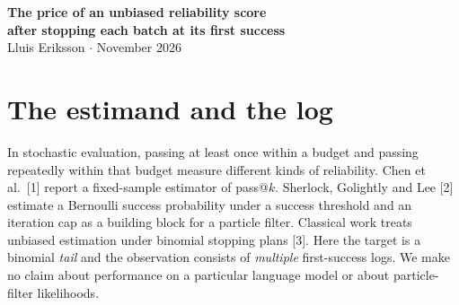 \documentclass[11pt]{article}
\begin{document}
\begin{center}{\LARGE\bfseries The price of an unbiased reliability score\\ after stopping each batch at its first success}\\[8pt]
Lluis Eriksson \quad $\cdot$  November 2026
\end{center}
\begin{abstract}
Suppose a benchmark logs independent batches of identical Bernoulli trials, terminating each batch at its first success or its own cap. Can these logs estimate the chance of at least $m$ successes in the full budget of $T$ trials, where $m$ is the number of batches? Among all nonnegative scores unbiased for every success probability, the smallest possible upper bound is $\binom{T-1}{m-1}$, regardless of how the budget is split. An explicit score attains this bound and minimizes variance at every success probability within the nonnegative unbiased class. Balancing the batch caps minimizes that variance at fixed full budget, while increasing the expected number of trials actually observed. With unrestricted batch-specific success probabilities a nonnegative unbiased score does not exist for $1<m<T$. At a fixed common cap, persistent variation in task difficulty can make the expected score exponentially small relative to the target, even when the target itself is rare. With two attempts per task the mean underestimates the target for unequal interior probabilities. For any fixed cap we derive the log rate at which calibration changes as task failures become sparse, including examples with a full target of one and a limiting mean score strictly below one.
 For any fixed number of tasks with arbitrary individual success probabilities against a common background, we prove that the score underestimates the full tail on every success-count stratum once the bank is sufficiently large.
\end{abstract}
\section*{The estimand and the log}
In stochastic evaluation, passing at least once within a budget and passing repeatedly within that budget measure different kinds of reliability. Chen et al.\ [1] report a fixed-sample estimator of pass@$k$. Sherlock, Golightly and Lee [2] estimate a Bernoulli success probability under a success threshold and an iteration cap as a building block for a particle filter. Classical work treats unbiased estimation under binomial stopping plans [3]. Here the target is a binomial \emph{tail} and the observation consists of \emph{multiple} first-success logs. We make no claim about performance on a particular language model or about particle-filter likelihoods.
\end{document}
